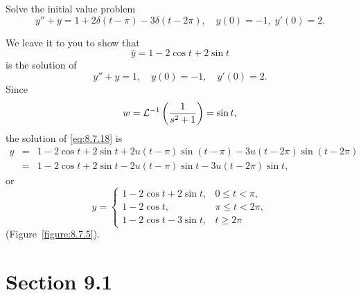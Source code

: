 \setcounter{example}{2}
\setcounter{equation}{17}
\begin{example}
  \label{example:8.7.3} \rm Solve the initial value problem
  \begin{equation}
    \label{eq:8.7.18}y''+y=1+2\delta(t-\pi)-3\delta(t-2\pi),\quad y(0)=-1,\;y'(0)=2.
  \end{equation}
\end{example}
\setcounter{equation}{18}
\begin{examplesolution}
\solution We leave it to you to show that
\[
  \hat{y}=1-2\cos t+2\sin t
\]
is the solution of
\[
  y''+y=1,\quad y(0)=-1,\quad y'(0)=2.
\]
Since
\[
  w={\cal L}^{-1}\left(\frac{1}{s^{2}+1}\right)=\sin t,
\]
the solution of \eqref{eq:8.7.18} is
\begin{eqnarray*}
  y & = & 1-2\cos t+2\sin t+2u(t-\pi)\sin(t-\pi)-3u(t-2\pi)\sin(t-2\pi) \\
    & = & 1-2\cos t+2\sin t-2u(t-\pi)\sin t-3u(t-2\pi)\sin t,
\end{eqnarray*}
or
\begin{equation}
  \label{eq:8.7.19}y=\left\{
  \begin{array}{cl}
    1-2\cos t+2\sin t, & 0\le t<\pi,    \\[5pt]
    1-2\cos t,         & \pi\le t<2\pi, \\[5pt]
    1-2\cos t-3\sin t, & t\ge2\pi
  \end{array}\right.
\end{equation}
(Figure~\ref{figure:8.7.5}).
\end{examplesolution}

\section*{Section 9.1}
{}
\setcounter{chapter}{9}
\setcounter{section}{1}

